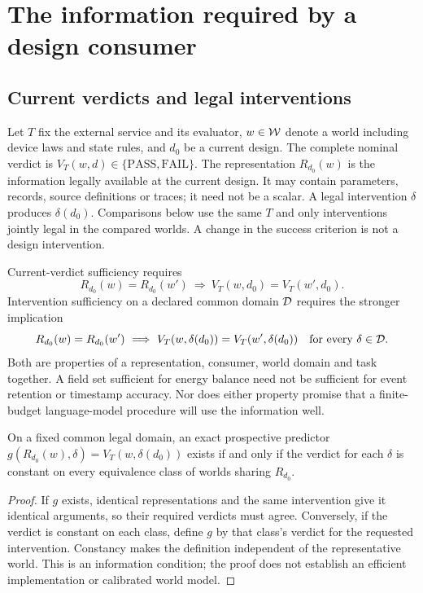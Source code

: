 \section{The information required by a design consumer}
\subsection{Current verdicts and legal interventions}
Let $T$ fix the external service and its evaluator, $w\in\mathcal W$ denote a world
including device laws and state rules, and $d_0$ be a current design. The
complete nominal verdict is $V_T(w,d)\in\{\mathrm{PASS},\mathrm{FAIL}\}$.
The representation $R_{d_0}(w)$ is the information legally available at the
current design. It may contain parameters, records, source definitions or
traces; it need not be a scalar. A legal intervention $\delta$ produces
$\delta(d_0)$. Comparisons below use the same $T$ and only interventions
jointly legal in the compared worlds. A change in the success criterion is
not a design intervention.

Current-verdict sufficiency requires
\begin{equation}
 R_{d_0}(w)=R_{d_0}(w')\ \Longrightarrow\
 V_T(w,d_0)=V_T(w',d_0).
 \label{eq:current}
\end{equation}
Intervention sufficiency on a declared common domain $\mathcal D$ requires the
stronger implication
\begin{equation}
 R_{d_0}(w)=R_{d_0}(w')\ \Longrightarrow\
 V_T(w,\delta(d_0))=V_T(w',\delta(d_0))
 \quad\text{for every }\delta\in\mathcal D.
 \label{eq:intervention}
\end{equation}
Both are properties of a representation, consumer, world domain and task
together. A field set sufficient for energy balance need not be sufficient
for event retention or timestamp accuracy. Nor does either property promise
that a finite-budget language-model procedure will use the information well.

\begin{proposition}
\label{prop:factorization}
On a fixed common legal domain, an exact prospective predictor
$g(R_{d_0}(w),\delta)=V_T(w,\delta(d_0))$ exists if and only if the verdict
for each $\delta$ is constant on every equivalence class of worlds sharing
$R_{d_0}$.
\end{proposition}
\begin{proof}
If $g$ exists, identical representations and the same intervention give it
identical arguments, so their required verdicts must agree. Conversely, if
the verdict is constant on each class, define $g$ by that class's verdict
for the requested intervention. Constancy makes the definition independent
of the representative world. This is an information condition; the proof
does not establish an efficient implementation or calibrated world model.
\end{proof}

